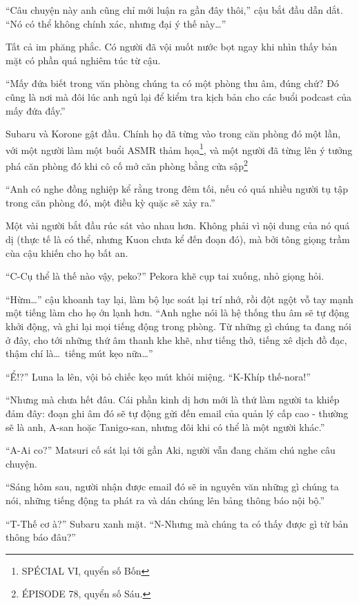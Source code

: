 \documentclass[../main.tex]{subfiles}
\begin{document}
``Câu chuyện này anh cũng chỉ mới luận ra gần đây thôi,'' cậu bắt đầu dẫn dắt. ``Nó có thể không chính xác, nhưng đại ý thế này\dots''

Tất cả im phăng phắc. Có người đã vội nuốt nước bọt ngay khi nhìn thấy bản mặt có phần quá nghiêm túc từ cậu.

``Mấy đứa biết trong văn phòng chúng ta có một phòng thu âm, đúng chứ? Đó cũng là nơi mà đôi lúc anh ngủ lại để kiểm tra kịch bản cho các buổi podcast của mấy đứa đấy.''

Subaru và Korone gật đầu. Chính họ đã từng vào trong căn phòng đó một lần, với một người làm một buổi ASMR thảm họa\footnote{{\flaregothic SPÉCIAL VI}, quyển số Bốn}, và một người đã từng lên ý tưởng phá căn phòng đó khi cô cố mở căn phòng bằng cửa sập\footnote{{\flaregothic ÉPISODE 78}, quyển số Sáu.}

``Anh có nghe đồng nghiệp kể rằng trong đêm tối, nếu có quá nhiều người tụ tập trong căn phòng đó, một điều kỳ quặc sẽ xảy ra.''

Một vài người bắt đầu rúc sát vào nhau hơn. Không phải vì nội dung của nó quá dị (thực tế là có thể, nhưng Kuon chưa kể đến đoạn đó), mà bởi tông giọng trầm cùa cậu khiến cho họ bất an.

``C-Cụ thể là thế nào vậy, peko?'' Pekora khẽ cụp tai xuống, nhỏ giọng hỏi.

``Hừm\dots'' cậu khoanh tay lại, làm bộ lục soát lại trí nhớ, rồi đột ngột vỗ tay mạnh một tiếng làm cho họ ớn lạnh hơn. ``Anh nghe nói là hệ thống thu âm sẽ tự động khởi động, và ghi lại mọi tiếng động trong phòng. Từ những gì chúng ta đang nói ở đây, cho tới những thứ âm thanh khe khẽ, như tiếng thở, tiếng xê dịch đồ đạc, thậm chí là\dots\ tiếng mút kẹo nữa\dots''

``Ể!?'' Luna la lên, vội bỏ chiếc kẹo mút khỏi miệng. ``K-Khíp thế-nora!''

``Nhưng mà chưa hết đâu. Cái phần kinh dị hơn mới là thứ làm người ta khiếp đảm đây: đoạn ghi âm đó sẽ tự động gửi đến email của quản lý cấp cao - thường sẽ là anh, A-san hoặc Tanigo-san, nhưng đôi khi có thể là một người khác.''

``A-Ai co?'' Matsuri cố sát lại tới gần Aki, người vẫn đang chăm chú nghe câu chuyện.

``Sáng hôm sau, người nhận được email đó sẽ in nguyên văn những gì chúng ta nói, những tiếng động ta phát ra và dán chúng lên bảng thông báo nội bộ.''

``T-Thế cơ à?'' Subaru xanh mặt. ``N-Nhưng mà chúng ta có thấy được gì từ bản thông báo đâu?''
\end{document}
